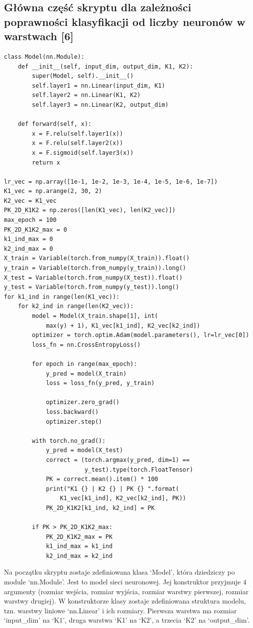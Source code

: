 \documentclass{article}
\begin{document}
\subsection{Główna część skryptu dla zależności poprawności klasyfikacji od liczby neuronów w warstwach [6]}
\begin{verbatim}
class Model(nn.Module):
    def __init__(self, input_dim, output_dim, K1, K2):
        super(Model, self).__init__()
        self.layer1 = nn.Linear(input_dim, K1)
        self.layer2 = nn.Linear(K1, K2)
        self.layer3 = nn.Linear(K2, output_dim)

    def forward(self, x):
        x = F.relu(self.layer1(x))
        x = F.relu(self.layer2(x))
        x = F.sigmoid(self.layer3(x))
        return x

lr_vec = np.array([1e-1, 1e-2, 1e-3, 1e-4, 1e-5, 1e-6, 1e-7])
K1_vec = np.arange(2, 30, 2)
K2_vec = K1_vec
PK_2D_K1K2 = np.zeros([len(K1_vec), len(K2_vec)])
max_epoch = 100
PK_2D_K1K2_max = 0
k1_ind_max = 0
k2_ind_max = 0
X_train = Variable(torch.from_numpy(X_train)).float()
y_train = Variable(torch.from_numpy(y_train)).long()
X_test = Variable(torch.from_numpy(X_test)).float()
y_test = Variable(torch.from_numpy(y_test)).long()
for k1_ind in range(len(K1_vec)):
    for k2_ind in range(len(K2_vec)):
        model = Model(X_train.shape[1], int(
            max(y) + 1), K1_vec[k1_ind], K2_vec[k2_ind])
        optimizer = torch.optim.Adam(model.parameters(), lr=lr_vec[0])
        loss_fn = nn.CrossEntropyLoss()

        for epoch in range(max_epoch):
            y_pred = model(X_train)
            loss = loss_fn(y_pred, y_train)

            optimizer.zero_grad()
            loss.backward()
            optimizer.step()

        with torch.no_grad():
            y_pred = model(X_test)
            correct = (torch.argmax(y_pred, dim=1) ==
                       y_test).type(torch.FloatTensor)
            PK = correct.mean().item() * 100
            print("K1 {} | K2 {} | PK {} ".format(
                K1_vec[k1_ind], K2_vec[k2_ind], PK))
            PK_2D_K1K2[k1_ind, k2_ind] = PK

        if PK > PK_2D_K1K2_max:
            PK_2D_K1K2_max = PK
            k1_ind_max = k1_ind
            k2_ind_max = k2_ind
\end{verbatim}

Na początku skryptu zostaje zdefiniowana klasa `Model', która dziedziczy po module `nn.Module'.
Jest to model sieci neuronowej.
Jej konstruktor przyjmuje $4$ argumenty (rozmiar wejścia, rozmiar wyjścia, rozmiar warstwy pierwszej, rozmiar warstwy drugiej).
W konstruktorze klasy zostaje zdefiniowana struktura modelu, tzn. warstwy liniowe `nn.Linear' i ich rozmiary.
Pierwsza warstwa ma rozmiar `input\_dim' na `K1', druga warstwa `K1' na `K2', a trzecia `K2' na `output\_dim'.
\end{document}
